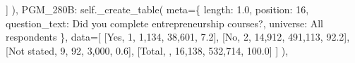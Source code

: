 \documentclass[
  11pt,
  a4paper,
]{article}
\newenvironment{Shaded}{\begin{snugshade}}{\end{snugshade}}
\newcommand{\NormalTok}[1]{\textcolor[rgb]{0.00,0.23,0.31}{#1}}
\newcommand{\OperatorTok}[1]{\textcolor[rgb]{0.37,0.37,0.37}{#1}}
\newcommand{\StringTok}[1]{\textcolor[rgb]{0.13,0.47,0.30}{#1}}
\newcommand{\VariableTok}[1]{\textcolor[rgb]{0.07,0.07,0.07}{#1}}
\begin{document}
\begin{Shaded}
\begin{Highlighting}[]
\NormalTok{                ]}
\NormalTok{            ),}
            \StringTok{\textquotesingle{}PGM\_280B\textquotesingle{}}\NormalTok{: }\VariableTok{self}\NormalTok{.\_create\_table(}
\NormalTok{                meta}\OperatorTok{=}\NormalTok{\{}
                    \StringTok{\textquotesingle{}length\textquotesingle{}}\NormalTok{: }\StringTok{\textquotesingle{}1.0\textquotesingle{}}\NormalTok{, }\StringTok{\textquotesingle{}position\textquotesingle{}}\NormalTok{: }\StringTok{\textquotesingle{}16\textquotesingle{}}\NormalTok{,}
                    \StringTok{\textquotesingle{}question\_text\textquotesingle{}}\NormalTok{: }\StringTok{\textquotesingle{}Did you complete entrepreneurship courses?\textquotesingle{}}\NormalTok{,}
                    \StringTok{\textquotesingle{}universe\textquotesingle{}}\NormalTok{: }\StringTok{\textquotesingle{}All respondents\textquotesingle{}}
\NormalTok{                \},}
\NormalTok{                data}\OperatorTok{=}\NormalTok{[}
\NormalTok{                    [}\StringTok{\textquotesingle{}Yes\textquotesingle{}}\NormalTok{, }\StringTok{\textquotesingle{}1\textquotesingle{}}\NormalTok{, }\StringTok{\textquotesingle{}1,134\textquotesingle{}}\NormalTok{, }\StringTok{\textquotesingle{}38,601\textquotesingle{}}\NormalTok{, }\StringTok{\textquotesingle{}7.2\textquotesingle{}}\NormalTok{],}
\NormalTok{                    [}\StringTok{\textquotesingle{}No\textquotesingle{}}\NormalTok{, }\StringTok{\textquotesingle{}2\textquotesingle{}}\NormalTok{, }\StringTok{\textquotesingle{}14,912\textquotesingle{}}\NormalTok{, }\StringTok{\textquotesingle{}491,113\textquotesingle{}}\NormalTok{, }\StringTok{\textquotesingle{}92.2\textquotesingle{}}\NormalTok{],}
\NormalTok{                    [}\StringTok{\textquotesingle{}Not stated\textquotesingle{}}\NormalTok{, }\StringTok{\textquotesingle{}9\textquotesingle{}}\NormalTok{, }\StringTok{\textquotesingle{}92\textquotesingle{}}\NormalTok{, }\StringTok{\textquotesingle{}3,000\textquotesingle{}}\NormalTok{, }\StringTok{\textquotesingle{}0.6\textquotesingle{}}\NormalTok{],}
\NormalTok{                    [}\StringTok{\textquotesingle{}Total\textquotesingle{}}\NormalTok{, }\StringTok{\textquotesingle{}\textquotesingle{}}\NormalTok{, }\StringTok{\textquotesingle{}16,138\textquotesingle{}}\NormalTok{, }\StringTok{\textquotesingle{}532,714\textquotesingle{}}\NormalTok{, }\StringTok{\textquotesingle{}100.0\textquotesingle{}}\NormalTok{]}
\NormalTok{                ]}
\NormalTok{            ),}


\end{Highlighting}
\end{Shaded}
\end{document}
